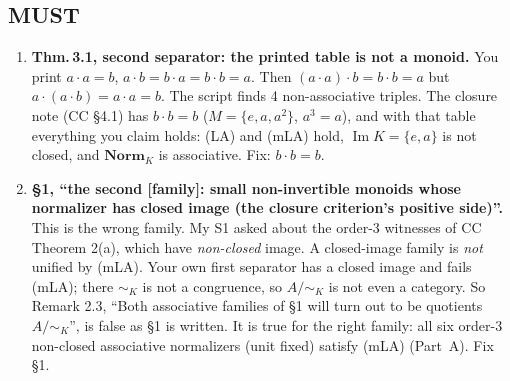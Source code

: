 \documentclass[11pt]{article}
\newcommand{\Norm}{\mathbf{Norm}}
\renewcommand{\Im}{\operatorname{Im}}
\begin{document}
\subsection*{MUST}
\begin{enumerate}[label=\textbf{M\arabic*.},leftmargin=*]
\item \textbf{Thm.\,3.1, second separator: the printed table is not a monoid.} You print
  $a\cdot a=b$, $a\cdot b=b\cdot a=b\cdot b=a$. Then $(a\cdot a)\cdot b=b\cdot b=a$ but
  $a\cdot(a\cdot b)=a\cdot a=b$. The script finds 4 non-associative triples. The closure note (CC
  \S4.1) has $b\cdot b=b$ ($M=\{e,a,a^2\}$, $a^3=a$), and with that table everything you claim holds: (LA) and (mLA)
  hold, $\Im K=\{e,a\}$ is not closed, and $\Norm_K$ is associative. Fix: $b\cdot b=b$.
\item \textbf{\S1, ``the second [family]: small non-invertible monoids whose normalizer has closed
  image (the closure criterion's positive side)''.} This is the wrong family. My S1 asked about the
  order-3 witnesses of CC Theorem 2(a), which have \emph{non-closed} image. A closed-image family is
  \emph{not} unified by (mLA). Your own first separator has a closed image and fails (mLA); there
  $\sim_K$ is not a congruence, so $A/{\sim_K}$ is not even a category. So Remark 2.3, ``Both associative
  families of \S1 will turn out to be quotients $A/{\sim_K}$'', is false as \S1 is written. It is true for
  the right family: all six order-3 non-closed associative normalizers (unit fixed) satisfy (mLA)
  (Part~A). Fix \S1.
\end{enumerate}
\end{document}
